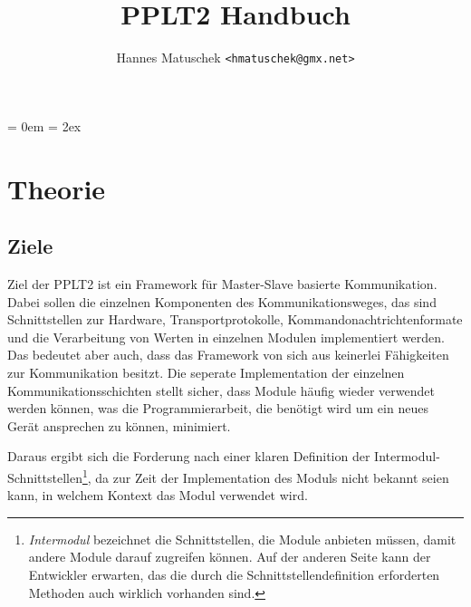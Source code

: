 \documentclass[a4paper,10pt]{book}
\title{PPLT2 Handbuch}
\author{Hannes Matuschek \texttt{<hmatuschek@gmx.net>}}
\begin{document}
	\parindent = 0em
	\parskip = 2ex


\chapter{Theorie}
\section{Ziele}
    Ziel der PPLT2 ist ein Framework für Master-Slave basierte Kommunikation. 
    Dabei sollen die einzelnen Komponenten des Kommunikationsweges, das sind 
    Schnittstellen zur Hardware, Transportprotokolle, 
    Kommandonachtrichtenformate und die Verarbeitung von Werten in einzelnen 
    Modulen implementiert werden. Das bedeutet aber auch, dass das Framework 
    von sich aus keinerlei Fähigkeiten zur Kommunikation besitzt. 
    Die seperate Implementation der einzelnen Kommunikationsschichten stellt
    sicher, dass Module häufig wieder verwendet werden können, was die 
    Programmierarbeit, die benötigt wird um ein neues Gerät ansprechen zu 
    können, minimiert. 
    
    Daraus ergibt sich die Forderung nach einer klaren Definition der 
    Intermodul-Schnittstellen\footnote{\emph{Intermodul} bezeichnet die 
    Schnittstellen, die Module anbieten müssen, damit andere Module darauf 
    zugreifen können. Auf der anderen Seite kann der Entwickler erwarten, 
    das die durch die Schnittstellendefinition erforderten Methoden auch
    wirklich vorhanden sind.}, da zur Zeit der Implementation des Moduls 
    nicht bekannt seien kann, in welchem Kontext das Modul verwendet wird.
    
\end{document}
